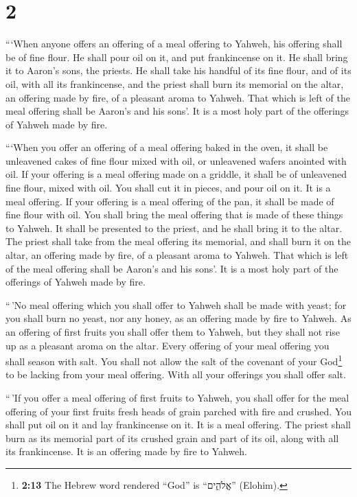 \hypertarget{section-1}{%
\section{2}\label{section-1}}

 ```When anyone offers an offering of a meal offering to
Yahweh, his offering shall be of fine flour. He shall pour oil on it,
and put frankincense on it.  He shall bring it to Aaron's
sons, the priests. He shall take his handful of its fine flour, and of
its oil, with all its frankincense, and the priest shall burn its
memorial on the altar, an offering made by fire, of a pleasant aroma to
Yahweh.  That which is left of the meal offering shall be
Aaron's and his sons'. It is a most holy part of the offerings of Yahweh
made by fire.

 ```When you offer an offering of a meal offering baked in
the oven, it shall be unleavened cakes of fine flour mixed with oil, or
unleavened wafers anointed with oil.  If your offering is
a meal offering made on a griddle, it shall be of unleavened fine flour,
mixed with oil.  You shall cut it in pieces, and pour oil
on it. It is a meal offering.  If your offering is a meal
offering of the pan, it shall be made of fine flour with oil.
 You shall bring the meal offering that is made of these
things to Yahweh. It shall be presented to the priest, and he shall
bring it to the altar.  The priest shall take from the
meal offering its memorial, and shall burn it on the altar, an offering
made by fire, of a pleasant aroma to Yahweh.  That which
is left of the meal offering shall be Aaron's and his sons'. It is a
most holy part of the offerings of Yahweh made by fire.

 ``\,'No meal offering which you shall offer to Yahweh
shall be made with yeast; for you shall burn no yeast, nor any honey, as
an offering made by fire to Yahweh.  As an offering of
first fruits you shall offer them to Yahweh, but they shall not rise up
as a pleasant aroma on the altar.  Every offering of your
meal offering you shall season with salt. You shall not allow the salt
of the covenant of your God\footnote{\textbf{2:13} The Hebrew word
  rendered ``God'' is ``אֱלֹהִ֑ים'' (Elohim).} to be lacking from your
meal offering. With all your offerings you shall offer salt.

 ``\,'If you offer a meal offering of first fruits to
Yahweh, you shall offer for the meal offering of your first fruits fresh
heads of grain parched with fire and crushed.  You shall
put oil on it and lay frankincense on it. It is a meal offering.
 The priest shall burn as its memorial part of its
crushed grain and part of its oil, along with all its frankincense. It
is an offering made by fire to Yahweh.

